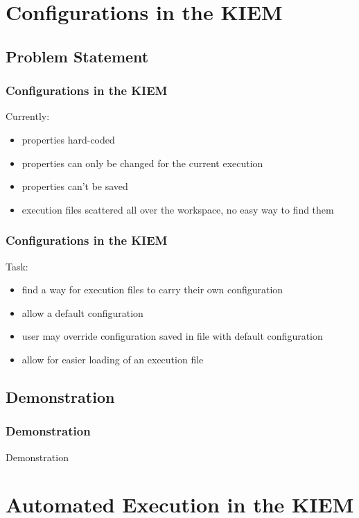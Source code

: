 %
%

\section{Configurations in the KIEM}
\subsection{Problem Statement}

\begin{frame}[fragile]
\frametitle{Configurations in the KIEM}
  Currently:
  \begin{itemize}
   \item properties hard-coded
  \item properties can only be changed for the current execution
 \item properties can't be saved
    \item execution files scattered all over the workspace, no easy way to find 
them
  \end{itemize}
\end{frame}

\begin{frame}[fragile]
\frametitle{Configurations in the KIEM}
Task:
  \begin{itemize}
   \item find a way for execution files to carry their own configuration
   \item allow a default configuration
    \item user may override configuration saved in file with default configuration
   \item allow for easier loading of an execution file
  \end{itemize}
\end{frame}

\subsection{Demonstration}
\begin{frame}[fragile]
\frametitle{Demonstration}
Demonstration
\end{frame}

\section{Automated Execution in the KIEM}
